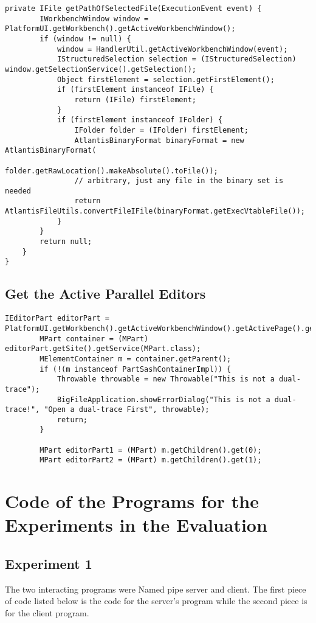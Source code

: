 \begin{lstlisting}[caption= code in OpenDualEditorsHandler.java]
	private IFile getPathOfSelectedFile(ExecutionEvent event) {
		IWorkbenchWindow window = PlatformUI.getWorkbench().getActiveWorkbenchWindow();
		if (window != null) {
			window = HandlerUtil.getActiveWorkbenchWindow(event);
			IStructuredSelection selection = (IStructuredSelection) window.getSelectionService().getSelection();
			Object firstElement = selection.getFirstElement();
			if (firstElement instanceof IFile) {
				return (IFile) firstElement;
			}
			if (firstElement instanceof IFolder) {
				IFolder folder = (IFolder) firstElement;
				AtlantisBinaryFormat binaryFormat = new AtlantisBinaryFormat(
						folder.getRawLocation().makeAbsolute().toFile());
				// arbitrary, just any file in the binary set is needed
				return AtlantisFileUtils.convertFileIFile(binaryFormat.getExecVtableFile());
			}
		}
		return null;
	}
}
\end{lstlisting}

\subsection{Get the Active Parallel Editors}
\begin{lstlisting}[caption= code for getting parallel editors ]
IEditorPart editorPart = PlatformUI.getWorkbench().getActiveWorkbenchWindow().getActivePage().getActiveEditor();
		MPart container = (MPart) editorPart.getSite().getService(MPart.class);
		MElementContainer m = container.getParent();
		if (!(m instanceof PartSashContainerImpl)) {
			Throwable throwable = new Throwable("This is not a dual-trace");
			BigFileApplication.showErrorDialog("This is not a dual-trace!", "Open a dual-trace First", throwable);
			return;
		}

		MPart editorPart1 = (MPart) m.getChildren().get(0);
		MPart editorPart2 = (MPart) m.getChildren().get(1);
\end{lstlisting}

\section{Code of the Programs for the Experiments in the Evaluation}\label{expcode}
\subsection{Experiment 1}
The two interacting programs were Named pipe server and client. The first piece of code listed below is the code for the server's program while the second piece is for the client program.




